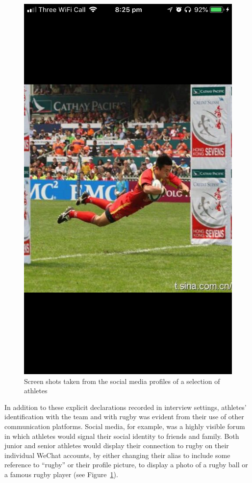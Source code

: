\begin{CJK}{UTF8}{gbsn}
\begin{figure}[!htbp]
    \includegraphics[scale =.1]{images/bjmWeChatProfile4.png}
    \caption{Screen shots taken from the social media profiles of a selection of athletes}
      \label{fig:bjmWeChatProfile}
\end{figure}

In addition to these explicit declarations recorded in interview settings, athletes' identification with the team and with rugby was evident from their use of other communication platforms.  Social media, for example, was a highly visible forum in which athletes would signal their social identity to friends and family.  Both junior and senior athletes would display their connection to rugby on their individual WeChat accounts, by either changing their alias to include some reference to ``rugby'' or their profile picture, to display a photo of a rugby ball or a famous rugby player (see Figure~\ref{fig:bjmWeChatProfile}).




\end{CJK}
